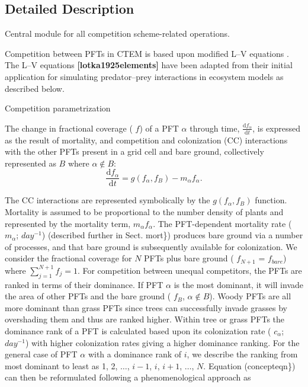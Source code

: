 \subsection{Detailed Description}
Central module for all competition scheme-\/related operations. 

Competition between P\+F\+Ts in C\+T\+E\+M is based upon modified L--V equations \cite{Arora2006-pp} \cite{Arora2006-ax}. The L--V equations {\bfseries [lotka1925elements]} \cite{Volterra1926-iz} have been adapted from their initial application for simulating predator--prey interactions in ecosystem models as described below.

Competition parametrization

The change in fractional coverage ( $f$) of a P\+F\+T $\alpha$ through time, $\frac{\mathrm{d}f_\alpha}{\mathrm{d}t}$, is expressed as the result of mortality, and competition and colonization (C\+C) interactions with the other P\+F\+Ts present in a grid cell and bare ground, collectively represented as $B$ where $\alpha \notin B$\+: \[ \label{concepteqn} \frac{\mathrm{d}f_\alpha}{\mathrm{d}t} = g(f_\alpha, f_B) - m_{\alpha} f_\alpha. \]

The C\+C interactions are represented symbolically by the $g(f_\alpha, f_B)$ function. Mortality is assumed to be proportional to the number density of plants and represented by the mortality term, $m_{\alpha} f_\alpha$. The P\+F\+T-\/dependent mortality rate ( $m_{\alpha}$; $day^{-1}$) (described further in Sect. mort\}) produces bare ground via a number of processes, and that bare ground is subsequently available for colonization. We consider the fractional coverage for $N$ P\+F\+Ts plus bare ground ( $f_{N+1}$ = $f_{bare}$) where $\sum_{j=1}^{N+1} f_{j}=1$. For competition between unequal competitors, the P\+F\+Ts are ranked in terms of their dominance. If P\+F\+T $\alpha$ is the most dominant, it will invade the area of other P\+F\+Ts and the bare ground ( $f_B$, $\alpha \notin B$). Woody P\+F\+Ts are all more dominant than grass P\+F\+Ts since trees can successfully invade grasses by overshading them \cite{Siemann2003-jl} and thus are ranked higher. Within tree or grass P\+F\+Ts the dominance rank of a P\+F\+T is calculated based upon its colonization rate ( $c_\alpha$; $day^{-1}$) with higher colonization rates giving a higher dominance ranking. For the general case of P\+F\+T $\alpha$ with a dominance rank of $i$, we describe the ranking from most dominant to least as 1, 2, ${\ldots}$, $i-1$, $i$, $i+1$, ${\ldots}$, $N$. Equation (concepteqn\}) can then be reformulated following a phenomenological approach as


